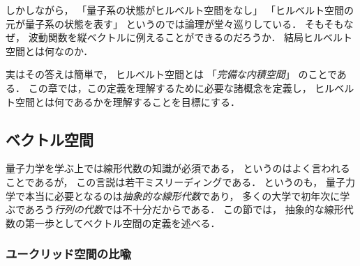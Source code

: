\documentclass[
]{sotsu}
\begin{document}
しかしながら，
「量子系の状態がヒルベルト空間をなし」
「ヒルベルト空間の元が量子系の状態を表す」
というのでは論理が堂々巡りしている．
そもそもなぜ，
波動関数を縦ベクトルに例えることができるのだろうか．
結局ヒルベルト空間とは何なのか．

実はその答えは簡単で，
ヒルベルト空間とは
「\emph{完備な内積空間}」
のことである．
この章では，この定義を理解するために必要な諸概念を定義し，
ヒルベルト空間とは何であるかを理解することを目標にする．



\subsection{ベクトル空間}
\label{sec:vector-space}

量子力学を学ぶ上では線形代数の知識が必須である，
というのはよく言われることであるが，
この言説は若干ミスリーディングである．
というのも，
量子力学で本当に必要となるのは\emph{抽象的な線形代数}であり，
多くの大学で初年次に学ぶであろう\emph{行列の代数}では不十分だからである．
この節では，
抽象的な線形代数の第一歩としてベクトル空間の定義を述べる．



\subsubsection{ユークリッド空間の比喩}
\label{sec:Euclidean-space}
\end{document}
